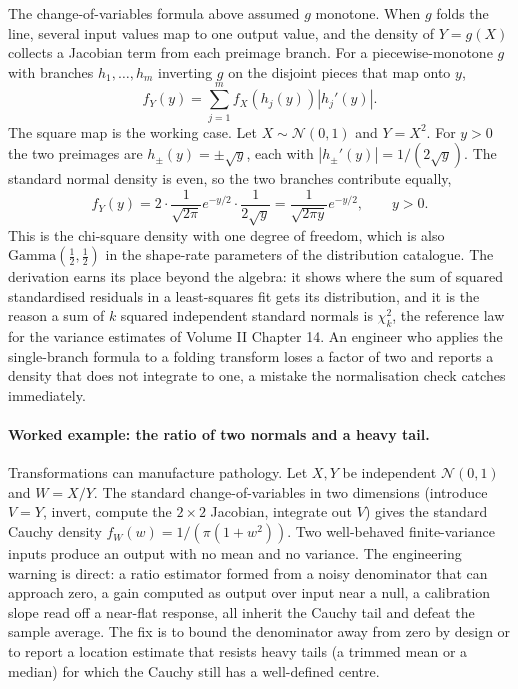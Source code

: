 The change-of-variables formula above assumed $g$ monotone. When $g$
folds the line, several input values map to one output value, and the
density of $Y = g(X)$ collects a Jacobian term from each preimage
branch. For a piecewise-monotone $g$ with branches $h_{1}, \ldots,
h_{m}$ inverting $g$ on the disjoint pieces that map onto $y$,
\[
f_{Y}(y) = \sum_{j=1}^{m} f_{X}(h_{j}(y)) \left| h_{j}'(y) \right|.
\]
The square map is the working case. Let $X \sim \mathcal{N}(0, 1)$
and $Y = X^{2}$. For $y > 0$ the two preimages are $h_{\pm}(y) =
\pm\sqrt{y}$, each with $|h_{\pm}'(y)| = 1/(2\sqrt{y})$. The standard
normal density is even, so the two branches contribute equally,
\[
f_{Y}(y) = 2 \cdot \frac{1}{\sqrt{2\pi}} e^{-y/2}
\cdot \frac{1}{2\sqrt{y}}
= \frac{1}{\sqrt{2\pi y}} e^{-y/2}, \qquad y > 0.
\]
This is the chi-square density with one degree of freedom, which is
also $\mathrm{Gamma}(\tfrac12, \tfrac12)$ in the shape-rate parameters
of the distribution catalogue. The derivation earns its place beyond
the algebra: it shows where the sum of squared standardised residuals
in a least-squares fit gets its distribution, and it is the reason a
sum of $k$ squared independent standard normals is $\chi^{2}_{k}$, the
reference law for the variance estimates of Volume II Chapter 14. An
engineer who applies the single-branch formula to a folding transform
loses a factor of two and reports a density that does not integrate to
one, a mistake the normalisation check catches immediately.

\paragraph{Worked example: the ratio of two normals and a heavy
tail.} Transformations can manufacture pathology. Let $X, Y$ be
independent $\mathcal{N}(0, 1)$ and $W = X/Y$. The standard
change-of-variables in two dimensions (introduce $V = Y$, invert,
compute the $2 \times 2$ Jacobian, integrate out $V$) gives the
standard Cauchy density $f_{W}(w) = 1/(\pi(1 + w^{2}))$. Two
well-behaved finite-variance inputs produce an output with no mean
and no variance. The engineering warning is direct: a ratio estimator
formed from a noisy denominator that can approach zero, a gain
computed as output over input near a null, a calibration slope read
off a near-flat response, all inherit the Cauchy tail and defeat the
sample average. The fix is to bound the denominator away from zero by
design or to report a location estimate that resists heavy tails (a
trimmed mean or a median) for which the Cauchy still has a
well-defined centre.

